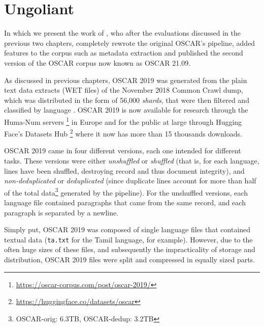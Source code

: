 \chapter{Ungoliant}

\begin{center}
    \begin{minipage}{0.66\textwidth}
        \begin{small}
            In which we present the work of \citet{abadji-etal-2021-ungoliant}, who after the evaluations discussed in the previous two chapters, completely rewrote the original OSCAR's \goclassy pipeline, added features to the corpus such as metadata extraction and published the second version of the OSCAR corpus now known as OSCAR 21.09.
        \end{small}
    \end{minipage}
    \vspace{0.5cm}
\end{center}


As discussed in previous chapters, OSCAR 2019 was generated from the plain text data extracts (WET files) of the November 2018 Common Crawl dump, which was distributed in the form of 56,000 \emph{shards}, that were then filtered and classified by language \citep{ortiz-suarez-etal-2019-asynchronous,ortiz-suarez-etal-2020-monolingual}. OSCAR 2019 is now available for research through the Huma-Num servers \footnote{\url{https://oscar-corpus.com/post/oscar-2019/}} in Europe and for the public at large through Hugging Face's Datasets Hub \footnote{\url{https://huggingface.co/datasets/oscar}} where it now has more than 15 thousands downloads.

OSCAR 2019 came in four different versions, each one intended for different tasks. These versions were either \emph{unshuffled} or \emph{shuffled} (that is, for each language, lines have been shuffled, destroying record and thus document integrity), and \emph{non-deduplicated} or \emph{deduplicated} (since duplicate lines account for more than half of the total data\footnote{OSCAR-orig: 6.3TB, OSCAR-dedup: 3.2TB} generated by the pipeline). For the unshuffled versions, each language file contained paragraphs that came from the same record, and each paragraph is separated by a newline.

Simply put, OSCAR 2019 was composed of single language files that contained textual data (\texttt{ta.txt} for the Tamil language, for example). However, due to the often huge sizes of these files, and subsequently the impracticality of storage and distribution, OSCAR 2019 files were split and compressed in equally sized parts.

